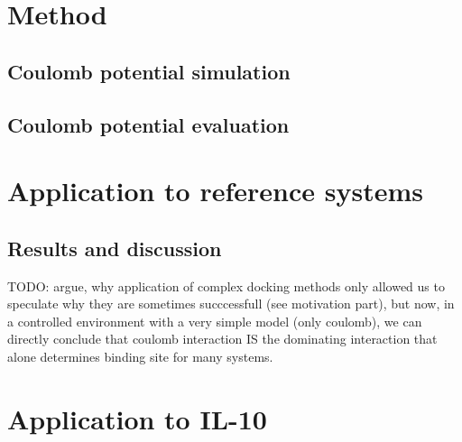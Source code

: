 %


\section{Method}

\subsection{Coulomb potential simulation}

\subsection{Coulomb potential evaluation}

\section{Application to reference systems}

\subsection{Results and discussion}

TODO: argue, why application of complex docking methods only allowed us to
speculate why they are sometimes succcessfull (see motivation part), but now,
in a controlled environment with a very simple model (only coulomb), we can
directly conclude that coulomb interaction IS the dominating interaction that
alone determines binding site for many systems.


\section{Application to IL-10}





